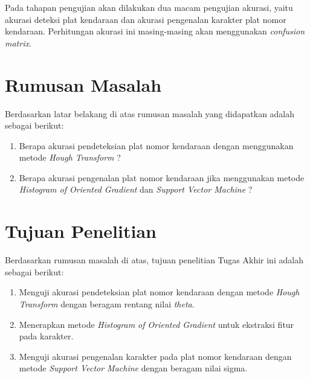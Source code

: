 \noindent Pada tahapan pengujian akan dilakukan dua macam pengujian akurasi, yaitu akurasi deteksi plat kendaraan dan akurasi pengenalan karakter plat nomor kendaraan. Perhitungan akurasi ini masing-masing akan menggunakan \textit{confusion matrix}.\\

\section{Rumusan Masalah}
\noindent Berdasarkan latar belakang di atas rumusan masalah yang didapatkan adalah sebagai berikut:
\begin{enumerate}[nolistsep,leftmargin=0.5cm]
\item Berapa akurasi pendeteksian plat nomor kendaraan dengan menggunakan metode \textit{Hough Transform} ?
\item Berapa akurasi pengenalan plat nomor kendaraan jika menggunakan metode \textit{Histogram of Oriented Gradient} dan \textit{Support Vector Machine} ? \\
\end{enumerate}

\section{Tujuan Penelitian}
\noindent Berdasarkan rumusan masalah di atas, tujuan penelitian Tugas Akhir ini adalah sebagai berikut:
\begin{enumerate}[nolistsep,leftmargin=0.5cm]
\item Menguji akurasi pendeteksian plat nomor kendaraan dengan metode \textit{Hough Transform} dengan beragam rentang nilai \textit{theta}.
\item Menerapkan metode \textit{Histogram of Oriented Gradient} untuk ekstraksi fitur pada karakter.
\item Menguji akurasi pengenalan karakter pada plat nomor kendaraan dengan metode \textit{Support Vector Machine} dengan beragam nilai sigma.\\
\end{enumerate}


